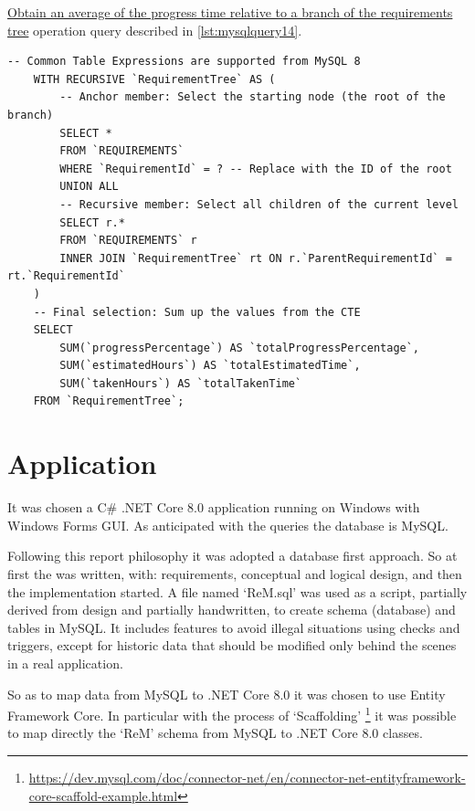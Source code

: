 \documentclass[12pt, a4paper]{report}
\begin{document}
\hyperref[subsubsec:op14]{Obtain an average of the progress time relative to a branch of the requirements tree} operation
query described in \autoref{lst:mysqlquery14}.

\begin{lstlisting}[language=MySQL, caption={\texorpdfstring{\hyperref[subsubsec:op14]{op. 14}}{op. 14}}, label={lst:mysqlquery14}]
    -- Common Table Expressions are supported from MySQL 8
    WITH RECURSIVE `RequirementTree` AS (
        -- Anchor member: Select the starting node (the root of the branch)
        SELECT *
        FROM `REQUIREMENTS`
        WHERE `RequirementId` = ? -- Replace with the ID of the root
        UNION ALL
        -- Recursive member: Select all children of the current level
        SELECT r.*
        FROM `REQUIREMENTS` r
        INNER JOIN `RequirementTree` rt ON r.`ParentRequirementId` = rt.`RequirementId`
    )
    -- Final selection: Sum up the values from the CTE
    SELECT
        SUM(`progressPercentage`) AS `totalProgressPercentage`,
        SUM(`estimatedHours`) AS `totalEstimatedTime`,
        SUM(`takenHours`) AS `totalTakenTime`
    FROM `RequirementTree`;
\end{lstlisting}

\section*{Application}

It was chosen a C\# .NET Core 8.0 application running on Windows with Windows Forms GUI.
As anticipated with the queries the database is MySQL.

Following this report philosophy it was adopted a database first approach.
So at first the  was written, with: requirements, conceptual and logical design, and then the
implementation started.
A file named `ReM.sql' was used as a script, partially derived from design and partially handwritten, to create schema (database)
and tables in MySQL. It includes features to avoid illegal situations using checks and triggers, except for historic data that
should be modified only behind the scenes in a real application.

So as to map data from MySQL to .NET Core 8.0 it was chosen to use Entity Framework Core.
In particular with the process of `Scaffolding'
\footnote{\url{https://dev.mysql.com/doc/connector-net/en/connector-net-entityframework-core-scaffold-example.html}}
it was possible to map directly the `ReM' schema from MySQL to .NET Core 8.0 classes.


\end{document}

